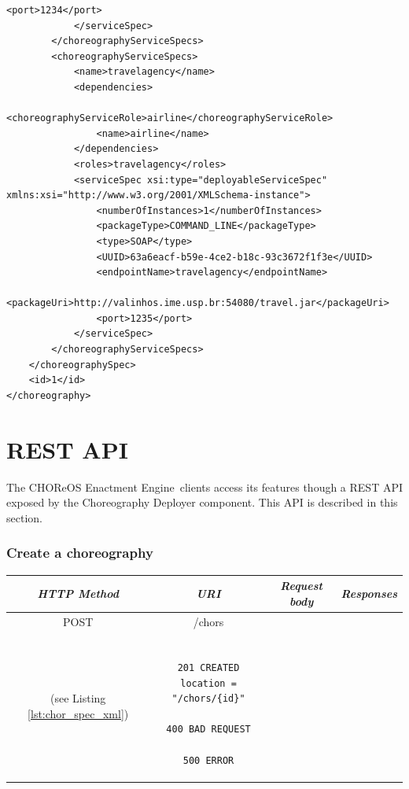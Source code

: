 \documentclass[a4paper, 10pt]{article}
\newcommand{\ee}{CHOReOS Enactment Engine}
\begin{document}
{\begin{lstlisting}[caption=Choreography XML representation example, label=lst:chor_xml]
                <port>1234</port>
            </serviceSpec>
        </choreographyServiceSpecs>
        <choreographyServiceSpecs>
            <name>travelagency</name>
            <dependencies>
                <choreographyServiceRole>airline</choreographyServiceRole>
                <name>airline</name>
            </dependencies>
            <roles>travelagency</roles>
            <serviceSpec xsi:type="deployableServiceSpec" 
xmlns:xsi="http://www.w3.org/2001/XMLSchema-instance">
                <numberOfInstances>1</numberOfInstances>
                <packageType>COMMAND_LINE</packageType>
                <type>SOAP</type>
                <UUID>63a6eacf-b59e-4ce2-b18c-93c3672f1f3e</UUID>
                <endpointName>travelagency</endpointName>
                <packageUri>http://valinhos.ime.usp.br:54080/travel.jar</packageUri>
                <port>1235</port>
            </serviceSpec>
        </choreographyServiceSpecs>
    </choreographySpec>
    <id>1</id>
</choreography>
\end{lstlisting}

}

\section{REST API}
\label{sec:api}

The \ee\ clients access its features though a REST API exposed by the Choreography Deployer component. This API is described in this section.

\subsubsection*{Create a choreography}

\begin{tabular}{|c|c|c|c|}
\hline 
\itshape{HTTP Method} & \itshape{URI} & \itshape{Request body} & \itshape{Responses} \\ 
\hline 
POST & /chors & 

\begin{minipage}{2in}
\verb!ChorSpec! XML representation \\ 
(see Listing \ref{lst:chor_spec_xml})
\end{minipage} 
&

\begin{minipage}{2in}
\begin{verbatim}

201 CREATED
location = "/chors/{id}"

400 BAD REQUEST

500 ERROR

\end{verbatim}
\end{minipage} 
\\ 
\hline 
\end{tabular} \\
\end{document}
